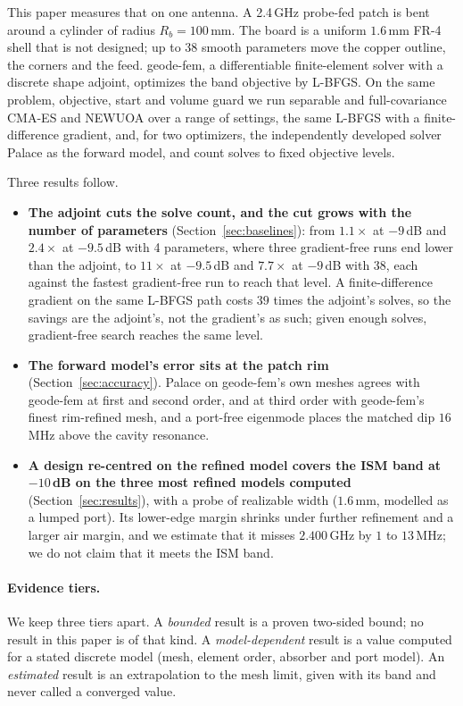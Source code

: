 \documentclass{anvil-paper}
\begin{document}
This paper measures that on one antenna. A 2.4\,GHz probe-fed patch is bent
around a cylinder of radius $R_b = 100$\,mm. The board is a uniform
$1.6$\,mm FR-4 shell that is not designed; up to 38 smooth parameters move
the copper outline, the corners and the feed. geode-fem, a differentiable
finite-element solver with a discrete shape adjoint, optimizes the band
objective by L-BFGS. On the same problem, objective, start and volume guard
we run separable and full-covariance CMA-ES
\citep{hansen2001cmaes,ros2008separable} and NEWUOA
\citep{powell2006newuoa,zhang2023prima} over a range of settings, the same
L-BFGS with a finite-difference gradient, and, for two optimizers, the
independently developed solver Palace \citep{palace} as the forward model,
and count solves to fixed objective levels.

Three results follow.
\begin{itemize}
  \item \textbf{The adjoint cuts the solve count, and the cut grows with the
  number of parameters} (Section~\ref{sec:baselines}): from $1.1\times$ at
  $-9$\,dB and $2.4\times$ at $-9.5$\,dB with 4 parameters, where three
  gradient-free runs end lower than the adjoint, to $11\times$ at $-9.5$\,dB and $7.7\times$ at $-9$\,dB with 38,
  each against the fastest gradient-free run to reach that level. A
  finite-difference gradient on the same L-BFGS path costs $39$ times the
  adjoint's solves, so the savings are the adjoint's, not the gradient's as
  such; given enough solves, gradient-free search reaches the same level.
  \item \textbf{The forward model's error sits at the patch rim}
  (Section~\ref{sec:accuracy}). Palace on geode-fem's own meshes agrees with
  geode-fem at first and second order, and at third order with geode-fem's
  finest rim-refined mesh, and a port-free eigenmode
  places the matched dip $16$\,MHz above the cavity resonance.
  \item \textbf{A design re-centred on the refined model covers the ISM band
  at $-10$\,dB on the three most refined models computed}
  (Section~\ref{sec:results}), with a probe of realizable width ($1.6$\,mm,
  modelled as a lumped port). Its lower-edge margin shrinks under further
  refinement and a larger air margin, and we estimate that it misses
  $2.400$\,GHz by $1$ to $13$\,MHz; we do not claim that it meets the ISM band.
\end{itemize}

\paragraph{Evidence tiers.}
We keep three tiers apart. A \emph{bounded} result is a proven two-sided
bound; no result in this paper is of that kind. A \emph{model-dependent}
result is a value computed for a stated discrete model (mesh, element order,
absorber and port model). An \emph{estimated} result is an extrapolation to
the mesh limit, given with its band and never called a converged value.
\end{document}
